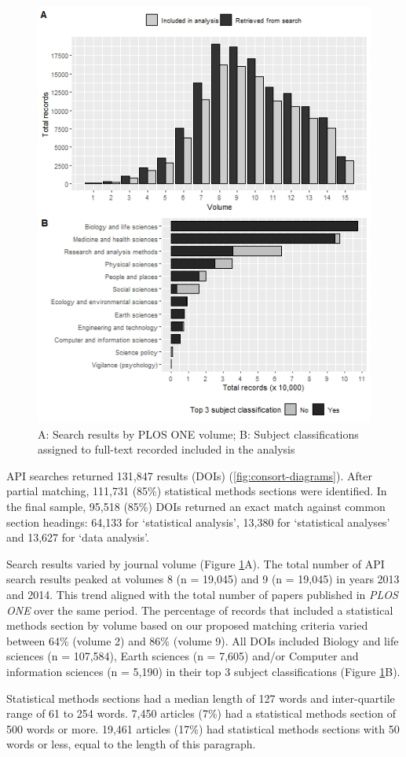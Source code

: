 \documentclass[12pt]{article}
\begin{document}
\begin{figure}

{\centering \includegraphics[width=0.6\linewidth]{figures/plos_summary} 

}

\caption{\label{fig:plos-n} A: Search results by PLOS ONE volume; B: Subject classifications assigned to full-text recorded included in the analysis}
\end{figure}

API searches returned 131,847 results (DOIs)
(\autoref{fig:consort-diagrams}). After partial matching, 111,731 (85\%)
statistical methods sections were identified. In the final sample,
95,518 (85\%) DOIs returned an exact match against common section
headings: 64,133 for `statistical analysis', 13,380 for `statistical
analyses' and 13,627 for `data analysis'.

Search results varied by journal volume (Figure \ref{fig:plos-n}A). The
total number of API search results peaked at volumes 8 (n = 19,045) and
9 (n = 19,045) in years 2013 and 2014. This trend aligned with the total
number of papers published in \emph{PLOS ONE} over the same period. The
percentage of records that included a statistical methods section by
volume based on our proposed matching criteria varied between 64\%
(volume 2) and 86\% (volume 9). All DOIs included Biology and life
sciences (n = 107,584), Earth sciences (n = 7,605) and/or Computer and
information sciences (n = 5,190) in their top 3 subject classifications
(Figure \ref{fig:plos-n}B).

Statistical methods sections had a median length of 127 words and
inter-quartile range of 61 to 254 words. 7,450 articles (7\%) had a
statistical methods section of 500 words or more. 19,461 articles (17\%)
had statistical methods sections with 50 words or less, equal to the
length of this paragraph.
\end{document}
